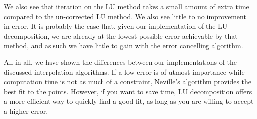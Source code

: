 We also see that iteration on the LU method takes a small amount of extra time compared to the un-corrected LU method. We also see little to no improvement in error. It is probably the case that, given our implementation of the LU decomposition, we are already at the lowest possible error achievable by that method, and as such we have little to gain with the error cancelling algorithm. 

All in all, we have shown the differences between our implementations of the discussed interpolation algorithms. If a low error is of utmost importance while computation time is not as much of a constraint, Neville's algorithm provides the best fit to the points. However, if you want to save time, LU decomposition offers a more efficient way to quickly find a good fit, as long as you are willing to accept a higher error.



